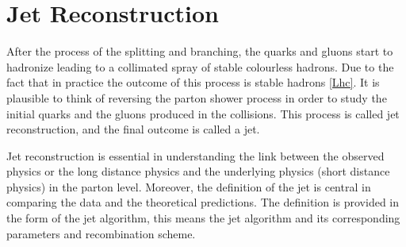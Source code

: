 \chapter{Jet Reconstruction}\label{chapter4}

After the process of the splitting and branching, the quarks and gluons start to hadronize leading to a collimated spray of stable colourless hadrons. Due to the fact that in practice
the  outcome of this process is stable hadrons \ref{Lhc}. It is plausible to think of reversing the parton shower process in order to study the initial quarks and the gluons produced in the collisions. This process is called jet reconstruction, and the final outcome is called a jet.     

Jet reconstruction is essential in understanding the link between the observed physics or the long distance physics and the underlying physics (short distance physics) in the parton level. Moreover, 
the definition of the jet is central in comparing the data and the theoretical predictions. The definition is provided in the form of the jet algorithm, this means the jet algorithm and its corresponding parameters and recombination scheme.








